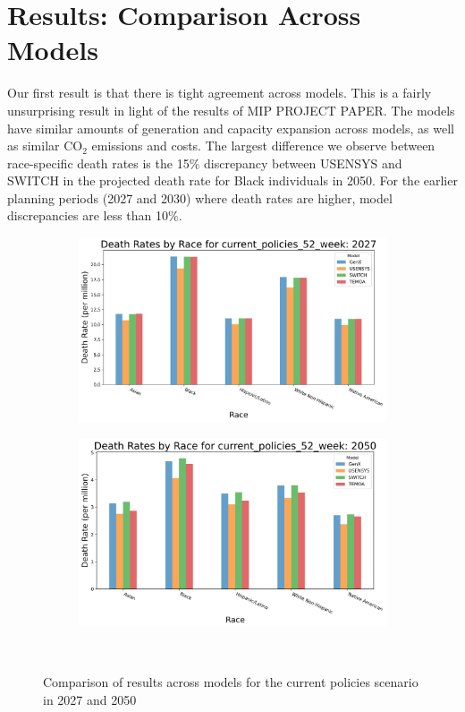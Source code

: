 \documentclass[a4paper]{article}
\theoremstyle{definition}
\theoremstyle{plain}
\begin{document}
\section{Results: Comparison Across Models}
Our first result is that there is tight agreement across models.  This is a fairly unsurprising result in light of the results of MIP PROJECT PAPER.  The models have similar amounts of generation and capacity expansion across models, as well as similar CO$_2$ emissions and costs.  The largest difference we observe between race-specific death rates is the 15$\%$ discrepancy between USENSYS and SWITCH in the projected death rate for Black individuals in 2050.  For the earlier planning periods (2027 and 2030) where death rates are higher, model discrepancies are less than 10$\%$.

\begin{figure}
    \centering
    \begin{subfigure}[b]{0.45\textwidth}
        \includegraphics[width=\textwidth]{Figures/Output/DeathRate_Across_Models_current_policies_52_week_2027.png}
        \label{2027CompareModels}
    \end{subfigure}
    \hfill
    \begin{subfigure}[b]{0.45\textwidth}
        \includegraphics[width=\textwidth]{Figures/Output/DeathRate_Across_Models_current_policies_52_week_2050.png}
        \label{2050CompareModels}
    \end{subfigure}\\

    \caption{Comparison of results across models for the current policies scenario in 2027 and 2050}
    \label{Compare Scenarios}
\end{figure}
\end{document}

